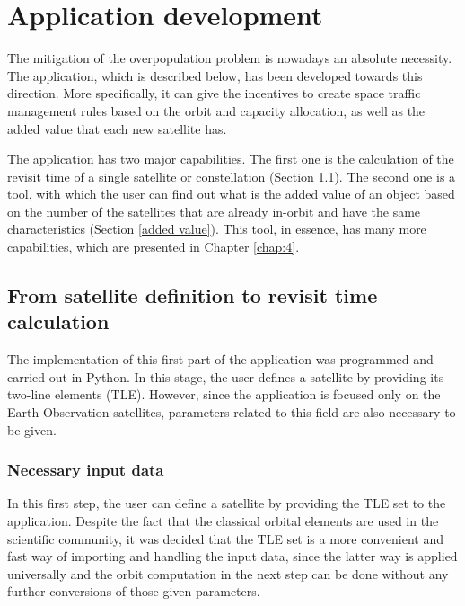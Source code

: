 \chapter{Application development}
\label{chap:3}
\bigskip

The mitigation of the overpopulation problem is nowadays an absolute necessity. The application, which is described below, has been developed towards this direction. More specifically, it can give the incentives to create space traffic management rules based on the orbit and capacity allocation, as well as the added value that each new satellite has.

The application has two major capabilities. The first one is the calculation of the revisit time of a single satellite or constellation (Section \ref{revisit time}). The second one is a tool, with which the user can find out what is the added value of an object based on the number of the satellites that are already in-orbit and have the same characteristics (Section \ref{added value}). This tool, in essence, has many more capabilities, which are presented in Chapter \ref{chap:4}.

\bigskip
\section{From satellite definition to revisit time calculation}
\label{revisit time}
\bigskip

The implementation of this first part of the application was programmed and carried out in Python. In this stage, the user defines a satellite by providing its two-line elements (TLE). However, since the application is focused only on the Earth Observation satellites, parameters related to this field are also necessary to be given.

\bigskip
\subsection{Necessary input data}
\bigskip

In this first step, the user can define a satellite by providing the TLE set to the application. Despite the fact that the classical orbital elements are used in the scientific community, it was decided that the TLE set is a more convenient and fast way of importing and handling the input data, since the latter way is applied universally and the orbit computation in the next step can be done without any further conversions of those given parameters.

